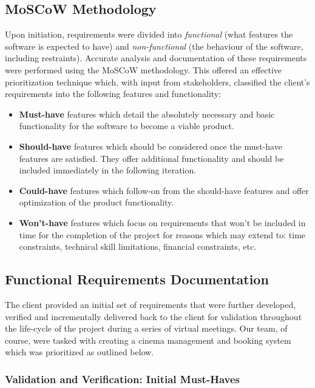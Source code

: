 \documentclass[11pt, english]{article}
\begin{document}
	\subsection{MoSCoW Methodology}

	Upon initiation, requirements were divided into \textit{functional} (what features the software is expected to have) and \textit{non-functional} (the behaviour of the software, including restraints). Accurate analysis and documentation of these requirements were performed using the MoSCoW methodology. This offered an effective prioritization technique which, with input from stakeholders, classified the client's requirements into the following features and functionality:

	\begin{itemize}
	\setlength\itemsep{0cm}
		\item \textbf{Must-have} features which detail the absolutely necessary and basic functionality for the software to become a viable product.
		\item \textbf{Should-have} features which should be considered once the must-have features are satisfied. They offer additional functionality and should be included immediately in the following iteration.
		\item \textbf{Could-have} features which follow-on from the should-have features and offer optimization of the product functionality.
		\item \textbf{Won't-have} features which focus on requirements that won't be included in time for the completion of the project for reasons which may extend to: time constraints, technical skill limitations, financial constraints, etc.
	\end{itemize}

	\subsection{Functional Requirements Documentation}

	The client provided an initial set of requirements that were further developed, verified and incrementally delivered back to the client for validation throughout the life-cycle of the project during a series of virtual meetings. Our team, of course, were tasked with creating a cinema management and booking system which was prioritized as outlined below.

		\subsubsection{Validation and Verification: Initial Must-Haves}
\end{document}
